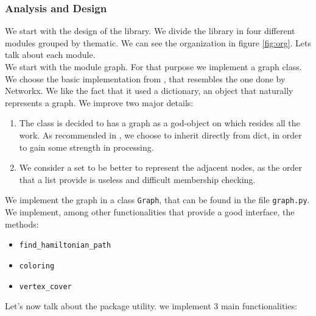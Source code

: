 \subsubsection{Analysis and Design}

We start with the design of the library. We divide the library in four different modules grouped by thematic. We can see the organization in figure \ref{fig:org}. Lets talk about each module.\\






We start with the module graph. For that purpose we implement a graph class.  We choose the basic implementation from \cite{graphAdvanced}, that resembles the one done by Networkx. We like the fact that it used a dictionary, an object that naturally represents a graph. We improve two major details:
  \begin{enumerate}
  \item The class is decided to has a graph as a god-object on which resides all the work. As recommended in \cite{slatkin2019effective}, we choose to inherit directly from dict, in order to gain some strength in processing.
  \item We consider a set to be better to represent the adjacent nodes, as the order that a list provide is useless and difficult membership checking.
  \end{enumerate}

  We implement the graph in a class \texttt{Graph}, that can be found in the file \texttt{graph.py}. We implement, among other functionalities that provide a good interface, the  methods:
  \begin{itemize}
  \item \texttt{find\_hamiltonian\_path}
  \item \texttt{coloring}
  \item \texttt{vertex\_cover}
  \end{itemize}


  Let's now talk about the package utility. we implement 3 main functionalities:


